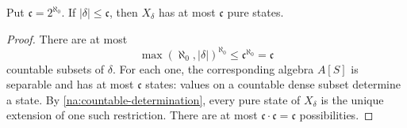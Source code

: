 \begin{corollary}\label{na:state-count}
Put $\mathfrak c=2^{\aleph_0}$. If $|\delta|\le\mathfrak c$, then
$X_\delta$ has at most $\mathfrak c$ pure states.
\end{corollary}
\begin{proof}
There are at most
\[
 \max(\aleph_0,|\delta|)^{\aleph_0}
 \le\mathfrak c^{\aleph_0}=\mathfrak c
\]
countable subsets of $\delta$. For each one, the corresponding
algebra $A[S]$ is separable and has at most $\mathfrak c$ states:
values on a countable dense subset determine a state. By
\cref{na:countable-determination}, every pure state of $X_\delta$
is the unique extension of one such restriction. There are at most
$\mathfrak c\cdot\mathfrak c=\mathfrak c$ possibilities.
\end{proof}
